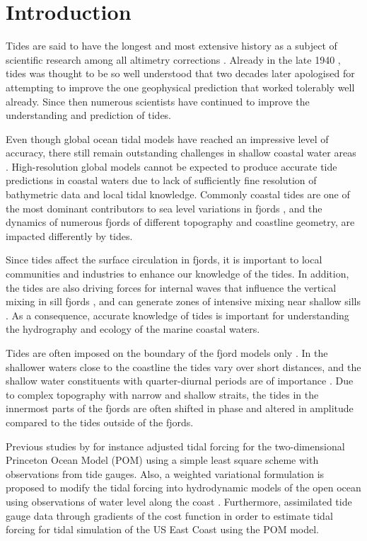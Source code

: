 \section{Introduction}

Tides are said to have the longest and most extensive history as a subject of scientific research among all altimetry corrections \cite[]{egbert94,cartwright77,hendershott81}. 
Already in the late 1940 \citep{unna47}, tides was thought to be so well understood that two decades later \cite{munk66} apologised for attempting to improve the one geophysical prediction that worked tolerably well already. Since then numerous scientists have continued to improve the understanding and prediction of tides. 

Even though global ocean tidal models have reached an impressive level of accuracy, there still remain outstanding challenges in shallow coastal water areas \citep{stammer14}. High-resolution global models cannot be expected to produce accurate tide predictions in coastal waters due to lack of sufficiently fine resolution of bathymetric data and local tidal knowledge. Commonly coastal tides are one of the most dominant contributors to sea level variations in fjords \citep[e.g.][]{grabbe09}, and the dynamics of numerous fjords of different topography and coastline geometry, are impacted differently by tides.

Since tides affect the surface circulation in fjords, it is important to local communities and industries to enhance our knowledge of the tides. In addition, the tides are also driving forces for internal waves that influence the vertical mixing in sill fjords \citep{stigebrandt76,staal16}, and can generate zones of intensive mixing near shallow sills \citep{staal15}. As a consequence, accurate knowledge of tides is important for understanding the hydrography and ecology of the marine coastal waters.

Tides are often imposed on the boundary of the fjord models only \citep{gjevik89,carniello05,lynge13}. In the shallower waters close to the coastline the tides vary over short distances, and the shallow water constituents with quarter-diurnal periods are of importance \citep[e.g.]{trygg74}. 
Due to complex topography with narrow and shallow straits, the tides in the innermost parts of the fjords are often shifted in phase and altered in amplitude compared to the tides outside of the fjords. 

Previous studies by for instance \cite{chen99} adjusted tidal forcing for the two-dimensional Princeton Ocean Model (POM) using a simple least square scheme with observations from tide gauges. Also, a weighted variational formulation is proposed to modify the tidal forcing into hydrodynamic models of the open ocean using observations of water level along the coast \citep{bennett82}. Furthermore, \cite{zhang03} assimilated tide gauge data through gradients of the cost function in order to estimate tidal forcing for tidal simulation of the US East Coast using the POM model.

